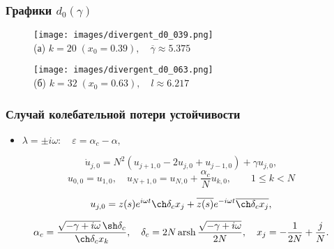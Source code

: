 \documentclass[fullscreen=true, unicode, bookmarks=false]{beamer}
\DeclareMathOperator{\arsh}{arsh}
\begin{document}
\begin{frame}
\frametitle{ Графики $ d_0(\gamma) $ }

\begin{figure} 
\begin{minipage}[h]{0.49\linewidth}
\begin{center}
\texttt{[image: images/divergent\_d0\_039.png]} \\ (а) $ k=20 \; (x_0=0.39), \quad \overline{\gamma}\approx 5.375 $
\end{center}
\end{minipage} 
\hfill
\begin{minipage}[h]{0.49\linewidth}
\begin{center}
\texttt{[image: images/divergent\_d0\_063.png]}  \\ (б) $ k=32 \; (x_0=0.63), \quad l \approx 6.217 $
\end{center}
\end{minipage} 
\end{figure}

\end{frame}

\begin{frame}
\frametitle{ Случай колебательной потери устойчивости }

\begin{itemize}
\item { $ \lambda = \pm i \omega: \quad \varepsilon=\alpha_c-\alpha, $
}
\end{itemize}

\bigskip

\begin{equation}
	\dot u_{j,0} = N^2(u_{j+1,0} - 2u_{j,0} + u_{j-1,0}) + \gamma u_{j,0},
\end{equation}
\begin{equation}
	u_{0,0} = u_{1,0}, \quad u_{N+1,0} = u_{N,0} + \dfrac{\alpha_c}{N}u_{k,0}, \qquad 1 \le k < N
\end{equation}

\bigskip

$$ u_{j,0} = z(s) e^{i \omega t} \ch \delta_c x_j + \overline{z(s)} e^{-i \omega t} \overline{\ch \delta_c x_j}, $$

\bigskip

$$ \alpha_c = \frac{ \sqrt{-\gamma + i \omega} \, \sh \delta_c }{ \ch\delta_c x_k }, \quad \delta_c = 2N \arsh \dfrac{\sqrt{-\gamma + i \omega}}{2N}, \quad x_j = -\dfrac{1}{2N} + \dfrac{j}{N}. $$

\end{frame}
\end{document}

